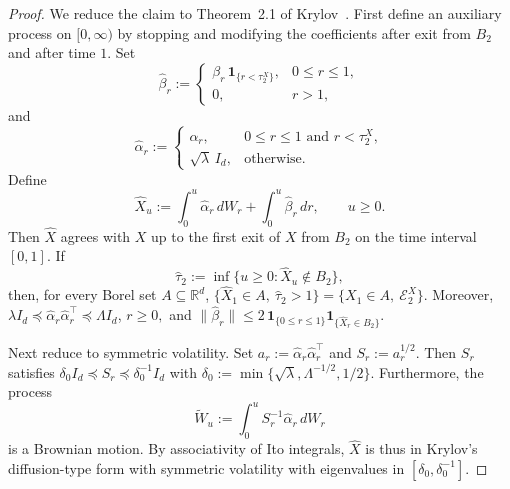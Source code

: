 \documentclass{article}
\newcommand{\1}{\mathbbm{1}}
\numberwithin{equation}{section}
\begin{document}
\begin{proof}
We reduce the claim to Theorem~2.1 of Krylov~\cite{Krylov2021Ldplus1}. First define an auxiliary process on $[0,\infty)$ by stopping and modifying
the coefficients after exit from $B_2$ and after time $1$. Set
\[
\widehat\beta_r
:=
\begin{cases}
\beta_r\,\mathbf 1_{\{r<\tau_2^X\}}, & 0\le r\le 1,\\
0, & r>1,
\end{cases}
\]
and
\[
\widehat\alpha_r
:=
\begin{cases}
\alpha_r, & 0\le r\le 1 \text{ and } r<\tau_2^X,\\
\sqrt{\lambda}\,I_d, & \text{otherwise}.
\end{cases}
\]
Define
\[
\widehat X_u
:=
\int_0^u \widehat\alpha_r\,dW_r
+
\int_0^u \widehat\beta_r\,dr,
\qquad u\ge0.
\]
Then $\widehat X$ agrees with $X$ up to the first exit of $X$ from $B_2$
on the time interval $[0,1]$. If
\[
\widehat\tau_2:=\inf\{u\ge0:\widehat X_u\notin B_2\},
\]
then, for every Borel set $A\subseteq\mathbb R^d$,
$
\{\widehat X_1\in A,\ \widehat\tau_2>1\}
=
\{X_1\in A,\ \mathcal E_2^X\}.
$ Moreover,
$
\lambda I_d
\preceq
\widehat\alpha_r\widehat\alpha_r^\top
\preceq
\Lambda I_d$, $r\ge0,
$
and
$
\|\widehat\beta_r\|
\le
2\,\mathbf 1_{\{0\le r\le1\}}\mathbf 1_{\{\widehat X_r\in B_2\}} .
$

Next reduce to symmetric volatility. Set
$
a_r:=\widehat\alpha_r\widehat\alpha_r^\top$ and $S_r:=a_r^{1/2}$.
Then $S_r$ satisfies
$
\delta_{0} I_{d}\preceq S_{r}\preceq \delta_{0}^{-1}I_{d}$ with $
\delta_0:=\min\{\sqrt{\lambda},\Lambda^{-1/2},1/2\}.
$
Furthermore, the process
\[
\widetilde W_u
:=
\int_0^u S_r^{-1}\widehat\alpha_r\,dW_r
\]
is a Brownian motion. By associativity of Ito integrals, $\widehat X$ is thus in Krylov's diffusion-type form with symmetric
volatility with eigenvalues in $[\delta_{0}, \delta_{0}^{-1}]$.


\end{proof}
\end{document}
